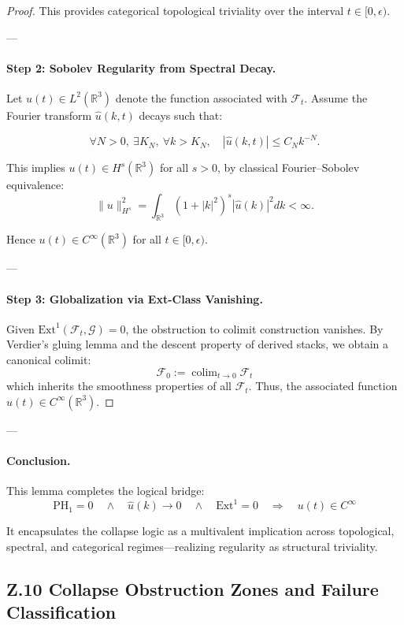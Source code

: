 \documentclass[11pt]{article}
\DeclareMathOperator{\colim}{colim}
\begin{document}
\begin{axiom}
\begin{axiom}
{{\begin{proof}
This provides categorical topological triviality over the interval \( t \in [0, \epsilon) \).

---

\paragraph{Step 2: Sobolev Regularity from Spectral Decay.}
Let \( u(t) \in L^2(\mathbb{R}^3) \) denote the function associated with \( \mathcal{F}_t \).  
Assume the Fourier transform \( \widehat{u}(k, t) \) decays such that:

\[
\forall N > 0,\ \exists K_N,\ \forall k > K_N,\quad
|\widehat{u}(k, t)| \leq C_N k^{-N}.
\]

This implies \( u(t) \in H^s(\mathbb{R}^3) \) for all \( s > 0 \),  
by classical Fourier–Sobolev equivalence:
\[
\| u \|_{H^s}^2 = \int_{\mathbb{R}^3} (1 + |k|^2)^s |\widehat{u}(k)|^2 dk < \infty.
\]

Hence \( u(t) \in C^\infty(\mathbb{R}^3) \) for all \( t \in [0, \epsilon) \).

---

\paragraph{Step 3: Globalization via Ext-Class Vanishing.}
Given \( \mathrm{Ext}^1(\mathcal{F}_t, \mathcal{G}) = 0 \),  
the obstruction to colimit construction vanishes.  
By Verdier’s gluing lemma and the descent property of derived stacks,  
we obtain a canonical colimit:
\[
\mathcal{F}_0 := \colim_{t \to 0} \mathcal{F}_t
\]
which inherits the smoothness properties of all \( \mathcal{F}_t \).  
Thus, the associated function \( u(t) \in C^\infty(\mathbb{R}^3) \).

\end{proof}

---

\paragraph{Conclusion.}
This lemma completes the logical bridge:
\[
\boxed{
\mathrm{PH}_1 = 0 \quad \wedge \quad \widehat{u}(k) \to 0 \quad \wedge \quad \mathrm{Ext}^1 = 0
\quad \Longrightarrow \quad u(t) \in C^\infty
}
\]

It encapsulates the collapse logic as a multivalent implication  
across topological, spectral, and categorical regimes—realizing regularity as structural triviality.


\subsection*{Z.10 Collapse Obstruction Zones and Failure Classification}

}}
\end{axiom}
\end{axiom}
\end{document}
